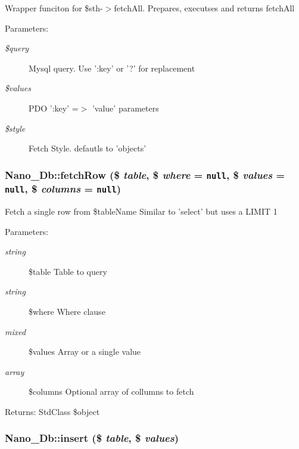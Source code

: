 Wrapper funciton for \$sth-$>$fetchAll. Prepares, executses and returns fetchAll

\begin{Desc}
\item[Parameters:]
\begin{description}
\item[{\em \$query}]Mysql query. Use ':key' or '?' for replacement \item[{\em \$values}]PDO ':key' =$>$ 'value' parameters \item[{\em \$style}]Fetch Style. defautls to 'objects' \end{description}
\end{Desc}
\hypertarget{classNano__Db_c1b16334752c17aac54b5e993b702062}{
\subsubsection[{fetchRow}]{\setlength{\rightskip}{0pt plus 5cm}Nano\_\-Db::fetchRow (\$ {\em table}, \/  \$ {\em where} = {\tt null}, \/  \$ {\em values} = {\tt null}, \/  \$ {\em columns} = {\tt null})}}
\label{classNano__Db_c1b16334752c17aac54b5e993b702062}


Fetch a single row from \$tableName Similar to 'select' but uses a LIMIT 1

\begin{Desc}
\item[Parameters:]
\begin{description}
\item[{\em string}]\$table Table to query \item[{\em string}]\$where Where clause \item[{\em mixed}]\$values Array or a single value \item[{\em array}]\$columns Optional array of collumns to fetch\end{description}
\end{Desc}
\begin{Desc}
\item[Returns:]StdClass \$object \end{Desc}
\hypertarget{classNano__Db_449280b23cb133a28b3dce201e3e994e}{
\subsubsection[{insert}]{\setlength{\rightskip}{0pt plus 5cm}Nano\_\-Db::insert (\$ {\em table}, \/  \$ {\em values})}}
\label{classNano__Db_449280b23cb133a28b3dce201e3e994e}


